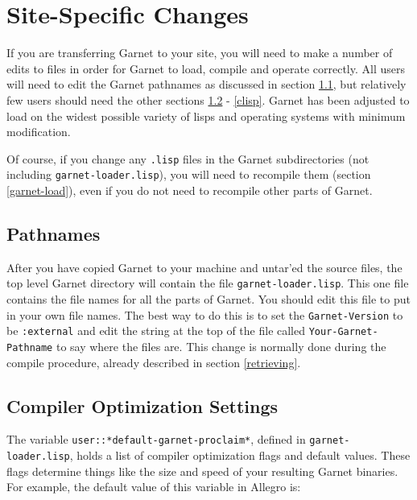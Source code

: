 \documentclass{report}
\begin{document}
\section{Site-Specific Changes}
  If you
are transferring Garnet to your site, you will need to make a number
of edits to files in order for Garnet to load, compile and operate
correctly.  All users will need to edit the Garnet pathnames as
discussed in section \ref{pathnames}, but relatively few users should
need the other sections \ref{optimization-settings} - \ref{clisp}.
Garnet has been adjusted to load on the widest possible variety of
lisps and operating systems with minimum modification.

Of course, if you change any \texttt{.lisp} files in the Garnet
subdirectories (not including \texttt{garnet-loader.lisp}), you will need
to recompile them (section \ref{garnet-load}), even if you do not need
to recompile other parts of Garnet.

\subsection{Pathnames}
\label{pathnames}
  

After you have copied Garnet to your machine and untar'ed the source
files, the top level Garnet directory will contain the file
\texttt{garnet-loader.lisp}.  This one file contains the file names for
all the parts of Garnet.  You should edit this file to put in your own
file names.  The best way to do this is to set the \texttt{Garnet-Version}
to be \texttt{:external} and edit the string at the top of the file called
\texttt{Your-Garnet-Pathname} to say where the files are.  This change is
normally done during the compile procedure, already described in
section \ref{retrieving}.

\subsection{Compiler Optimization Settings}
\label{optimization-settings}

The variable \texttt{user::*default-garnet-proclaim*}, defined in
\texttt{garnet-loader.lisp}, holds a list of compiler optimization flags
and default values.  These flags determine things like the size and
speed of your resulting Garnet binaries.  For example, the default
value of this variable in Allegro is:
\end{document}
